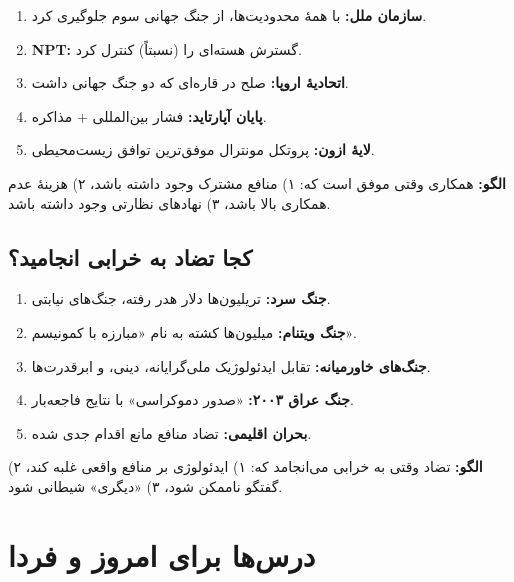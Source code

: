 \begin{tcolorbox}[
    enhanced,
    colback=centergreen!10,
    colframe=centergreen,
    boxrule=1.5pt,
    arc=5pt,
    fonttitle=\bfseries,
    title={\rl{✅ موفقیت‌های همکاری بین ایدئولوژیک}}
]
\begin{enumerate}
    \item \textbf{سازمان ملل:} با همهٔ محدودیت‌ها، از جنگ جهانی سوم جلوگیری کرد.
    \item \textbf{NPT:} گسترش هسته‌ای را (نسبتاً) کنترل کرد.
    \item \textbf{اتحادیهٔ اروپا:} صلح در قاره‌ای که دو جنگ جهانی داشت.
    \item \textbf{پایان آپارتاید:} فشار بین‌المللی + مذاکره.
    \item \textbf{لایهٔ ازون:} پروتکل مونترال موفق‌ترین توافق زیست‌محیطی.
\end{enumerate}

\textbf{الگو:} همکاری وقتی موفق است که: ۱) منافع مشترک وجود داشته باشد، ۲) هزینهٔ عدم همکاری بالا باشد، ۳) نهادهای نظارتی وجود داشته باشد.
\end{tcolorbox}

\subsection{کجا تضاد به خرابی انجامید؟}

\begin{tcolorbox}[
    enhanced,
    colback=leftred!10,
    colframe=leftred,
    boxrule=1.5pt,
    arc=5pt,
    fonttitle=\bfseries,
    title={\rl{❌ شکست‌های ناشی از تضاد ایدئولوژیک}}
]
\begin{enumerate}
    \item \textbf{جنگ سرد:} تریلیون‌ها دلار هدر رفته، جنگ‌های نیابتی.
    \item \textbf{جنگ ویتنام:} میلیون‌ها کشته به نام «مبارزه با کمونیسم».
    \item \textbf{جنگ‌های خاورمیانه:} تقابل ایدئولوژیک ملی‌گرایانه، دینی، و ابرقدرت‌ها.
    \item \textbf{جنگ عراق ۲۰۰۳:} «صدور دموکراسی» با نتایج فاجعه‌بار.
    \item \textbf{بحران اقلیمی:} تضاد منافع مانع اقدام جدی شده.
\end{enumerate}

\textbf{الگو:} تضاد وقتی به خرابی می‌انجامد که: ۱) ایدئولوژی بر منافع واقعی غلبه کند، ۲) گفتگو ناممکن شود، ۳) «دیگری» شیطانی شود.
\end{tcolorbox}

\section{درس‌ها برای امروز و فردا}

